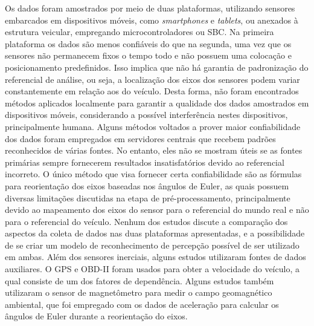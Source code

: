 Os dados foram amostrados por meio de duas plataformas, utilizando sensores embarcados em dispositivos móveis, como \textit{smartphones} e \textit{tablets}, ou anexados à estrutura veicular, empregando microcontroladores ou SBC. Na primeira plataforma os dados são menos confiáveis do que na segunda, uma vez que os sensores não permanecem fixos o tempo todo e não possuem uma colocação e posicionamento predefinidos. Isso implica que não há garantia de padronização do referencial de análise, ou seja, a localização dos eixos dos sensores podem variar constantemente em relação aos do veículo. Desta forma, não foram encontrados métodos aplicados localmente para garantir a qualidade dos dados amostrados em dispositivos móveis, considerando a possível interferência nestes dispositivos, principalmente humana. Alguns métodos voltados a prover maior confiabilidade dos dados foram empregados em servidores centrais que recebem padrões reconhecidos de várias fontes. No entanto, eles não se mostram úteis se as fontes primárias sempre fornecerem resultados insatisfatórios devido ao referencial incorreto. O único método que visa fornecer certa confiabilidade são as fórmulas para reorientação dos eixos baseadas nos ângulos de Euler, as quais possuem diversas limitações discutidas na etapa de pré-processamento, principalmente devido ao mapeamento dos eixos do sensor para o referencial do mundo real e não para o referencial do veículo. Nenhum dos estudos discute a comparação dos aspectos da coleta de dados nas duas plataformas apresentadas, e a possibilidade de se criar um modelo de reconhecimento de percepção possível de ser utilizado em ambas. Além dos sensores inerciais, alguns estudos utilizaram fontes de dados auxiliares. O GPS e OBD-II foram usados para obter a velocidade do veículo, a qual consiste de um dos fatores de dependência. Alguns estudos também utilizaram o sensor de magnetômetro para medir o campo geomagnético ambiental, que foi empregado com os dados de aceleração para calcular os ângulos de Euler durante a reorientação do eixos. 

